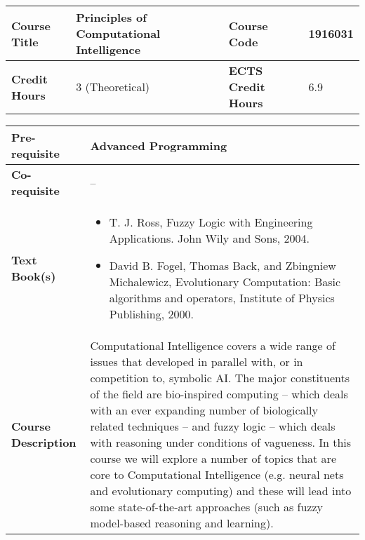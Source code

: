 \documentclass[12pt]{article}
\begin{document}
\begin{minipage}{\textwidth}
\begin{tabularx}{\textwidth}{|l|X|l|X|}
\hline
\textbf{Course Title}       &  Principles of Computational Intelligence & \textbf{Course Code}       &  1916031 \\ \hline
\textbf{Credit Hours}       &   3 (Theoretical) & \textbf{ECTS Credit Hours}       &  6.9 \\ \hline
\end{tabularx}

\begin{tabularx}{\textwidth}{|l|X|}
\hline
\textbf{Pre-requisite}      &  Advanced Programming \\ \hline
\textbf{Co-requisite}       &  -- \\ \hline
\textbf{Text Book(s)}      & \begin{minipage}{.70\textwidth}
					\begin{itemize} \itemsep-0.4em
						\vspace{3mm}
						\item T. J. Ross, Fuzzy Logic with Engineering Applications. John Wily and Sons, 2004.
						\item David B. Fogel, Thomas Back, and Zbingniew Michalewicz, Evolutionary Computation: Basic algorithms and operators, Institute of Physics Publishing, 2000.
						\vspace{3mm}
					\end{itemize}
				\end{minipage}  \\ \hline
\textbf{Course Description} & \begin{minipage}{.70\textwidth}
					\vspace{3mm}
					Computational Intelligence covers a wide range of issues that developed in parallel with, or in competition to, symbolic AI. The major constituents of the field are bio-inspired computing – which deals with an ever expanding number of biologically related techniques – and fuzzy logic – which deals with reasoning under conditions of vagueness. In this course we will explore a number of topics that are core to Computational Intelligence (e.g. neural nets and evolutionary computing) and these will lead into some state-of-the-art approaches (such as fuzzy model-based reasoning and learning).

					\vspace{3mm}
					\end{minipage} \\ \hline
\end{tabularx}
\end{minipage}


\bigskip
\bigskip
\end{document}
